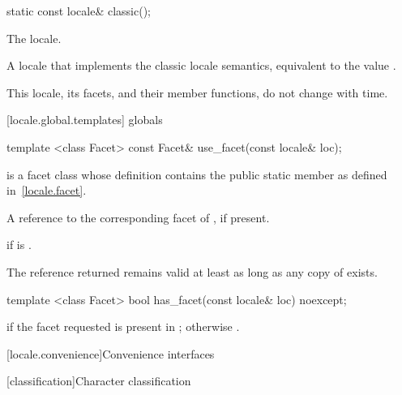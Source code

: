 %
\begin{itemdecl}
static const locale& classic();
\end{itemdecl}

\begin{itemdescr}
\pnum
The  locale.

\pnum
\returns
A locale that implements the classic  locale semantics, equivalent
to the value .

\pnum
\remarks
This locale, its facets, and their member functions, do not change
with time.
\end{itemdescr}

[locale.global.templates]{ globals}

%
\begin{itemdecl}
template <class Facet> const Facet& use_facet(const locale& loc);
\end{itemdecl}

\begin{itemdescr}
\pnum
\requires
{}
is a facet class whose definition contains the public static member
as defined in~\ref{locale.facet}.

\pnum
\returns
A reference to the corresponding facet of , if present.

\pnum
\throws
{}
if
is
.

\pnum
\remarks
The reference returned remains valid at least as long as any copy of
 exists.
\end{itemdescr}

%
\begin{itemdecl}
template <class Facet> bool has_facet(const locale& loc) noexcept;
\end{itemdecl}

\begin{itemdescr}
\pnum
\returns
{} if the facet requested is present in ; otherwise .
\end{itemdescr}

[locale.convenience]{Convenience interfaces}

[classification]{Character classification}

